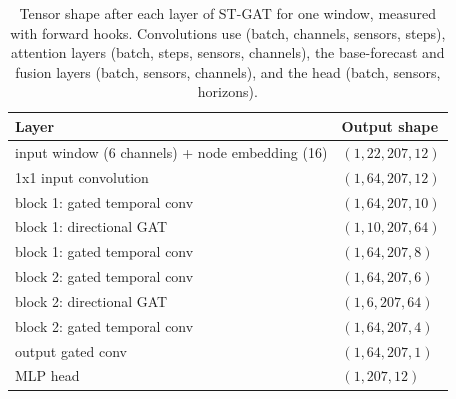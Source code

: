 \begin{table}[H]
\centering
\caption{Tensor shape after each layer of ST-GAT for one window, measured with forward hooks. Convolutions use (batch, channels, sensors, steps), attention layers (batch, steps, sensors, channels), the base-forecast and fusion layers (batch, sensors, channels), and the head (batch, sensors, horizons).}
\label{tab:stgatshapes}
\small
\begin{tabular}{ll}
\toprule
Layer & Output shape \\
\midrule
input window (6 channels) + node embedding (16) & $(1, 22, 207, 12)$ \\
1x1 input convolution & $(1, 64, 207, 12)$ \\
block 1: gated temporal conv & $(1, 64, 207, 10)$ \\
block 1: directional GAT & $(1, 10, 207, 64)$ \\
block 1: gated temporal conv & $(1, 64, 207, 8)$ \\
block 2: gated temporal conv & $(1, 64, 207, 6)$ \\
block 2: directional GAT & $(1, 6, 207, 64)$ \\
block 2: gated temporal conv & $(1, 64, 207, 4)$ \\
output gated conv & $(1, 64, 207, 1)$ \\
MLP head & $(1, 207, 12)$ \\
\bottomrule
\end{tabular}
\end{table}
